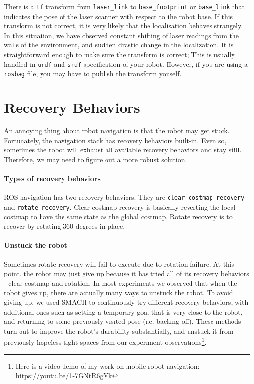 \documentclass[12pt]{article}
\begin{document}
There is a \texttt{tf} transform from \texttt{laser\_link} to \texttt{base\_footprint} or \texttt{base\_link} that indicates the pose of the laser scanner with respect to the robot base. If this transform is not correct, it is very likely that the localization behaves strangely. In this situation, we have observed constant shifting of laser readings from the walls of the environment, and sudden drastic change in the localization. It is straightforward enough to make sure the transform is correct; This is usually handled in \texttt{urdf} and \texttt{srdf} specification of your robot. However, if you are using a \texttt{rosbag} file, you may have to publish the transform youself.


\section{Recovery Behaviors}
An annoying thing about robot navigation is that the robot may get stuck. Fortunately, the navigation stack has recovery behaviors built-in. Even so, sometimes the robot will exhaust all available recovery behaviors and stay still. Therefore, we may need to figure out a more robust solution.

\paragraph{Types of recovery behaviors} ROS navigation has two recovery behaviors. They are \texttt{clear\_costmap\_recovery} and \texttt{rotate\_recovery}. Clear costmap recovery is basically reverting the local costmap to have the same state as the global costmap. Rotate recovery is to recover by
rotating 360 degrees in place. 

\paragraph{Unstuck the robot} Sometimes rotate recovery will fail to execute due to rotation failure. At this point, the robot may just give up because it has tried
all of its recovery behaviors - clear costmap and rotation. In most experiments we observed that when the robot gives up, there are actually many ways to unstuck the robot.
To avoid giving up, we used SMACH to continuously try different recovery behaviors, with additional ones such as setting a temporary goal that is very close to the robot, and returning to some previously visited pose (i.e. backing off). These methods turn out to improve the robot's durability substantially, and unstuck it from previously hopeless tight spaces from our experiment observations\footnote{Here is a video demo of my work on mobile robot navigation: \url{https://youtu.be/1-7GNtR6gVk}}.
\end{document}
